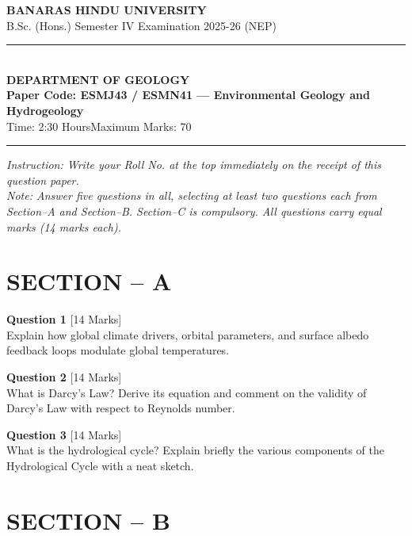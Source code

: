 \documentclass[11pt,a4paper]{article}
\begin{document}
\begin{center}
  {\large\bfseries BANARAS HINDU UNIVERSITY}\\[2pt]
  {\normalsize B.Sc. (Hons.) Semester IV Examination 2025-26 (NEP)}\\[6pt]
  \rule{0.8\linewidth}{0.5pt}\\[6pt]
  {\large\bfseries DEPARTMENT OF GEOLOGY}\\[4pt]
  {\large\bfseries Paper Code: ESMJ43 / ESMN41 --- Environmental Geology and Hydrogeology}\\[4pt]
  {\normalsize Time: 2:30 Hours\hfill Maximum Marks: 70}
\end{center}

\rule{\linewidth}{0.4pt}\smallskip



\noindent   \textit{Instruction: Write your Roll No. at the top immediately on the receipt of this question paper.}\\[2pt]



\noindent   \textit{Note: Answer five questions in all, selecting at least two questions each from Section--A and Section--B. Section--C is compulsory. All questions carry equal marks (14 marks each).}
\bigskip

\section*{SECTION -- A}




\noindent   \textbf{Question 1} \hfill [14 Marks]\\
Explain how global climate drivers, orbital parameters, and surface albedo feedback loops modulate global temperatures.

\bigskip




\noindent   \textbf{Question 2} \hfill [14 Marks]\\
What is Darcy's Law? Derive its equation and comment on the validity of Darcy's Law with respect to Reynolds number.

\bigskip




\noindent   \textbf{Question 3} \hfill [14 Marks]\\
What is the hydrological cycle? Explain briefly the various components of the Hydrological Cycle with a neat sketch.

\bigskip
\section*{SECTION -- B}
\end{document}
